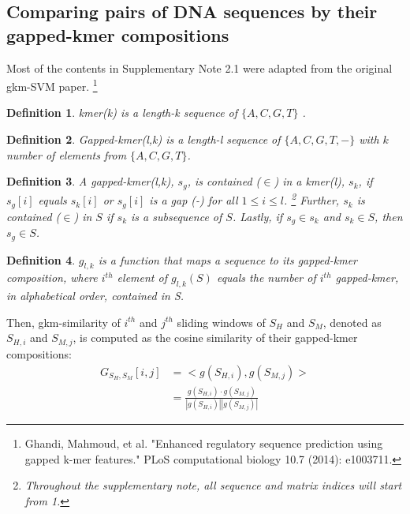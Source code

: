 \documentclass[english]{article}
\newtheorem{definition}{Definition}
\begin{document}
\subsection{Comparing pairs of DNA sequences by their gapped-kmer compositions}
Most of the contents in Supplementary Note 2.1 were adapted from the original gkm-SVM paper. \footnote{Ghandi, Mahmoud, et al. "Enhanced regulatory sequence prediction using gapped k-mer features." PLoS computational biology 10.7 (2014): e1003711.}
\begin{definition}
  kmer(k) is a length-k sequence of $\{A,C,G,T\}$ .
\end{definition}
\begin{definition}
  Gapped-kmer(l,k) is a length-l sequence of $\{A,C,G,T,-\}$ with $k$ number of elements from $\{A,C,G,T\}$.
\end{definition}
\begin{definition}
  A gapped-kmer(l,k), $s_g$, is contained ($\in$) in a kmer(l), $s_k$, if $s_g[i]$ equals $s_k[i]$ or $s_g[i]$ is a gap (-) for all $1\leq i\leq l$. \footnote{Throughout the supplementary note, all sequence and matrix indices will start from 1.} Further,
  $s_k$ is contained ($\in$) in $S$ if $s_k$ is a subsequence of $S$. Lastly, if $s_g \in s_k$ and $s_k \in S$, then $s_g \in S$.

\end{definition}

\begin{definition}
   $g_{l,k}$ is a function that maps a sequence to its gapped-kmer composition, where $i^{th}$ element of $g_{l,k}(S)$ equals the number of $i^{th}$ gapped-kmer, in alphabetical order, contained in S. 
\end{definition}

Then, gkm-similarity of $i^{th}$ and $j^{th}$ sliding windows of $S_H$ and $S_M$, denoted as $S_{H,i}$ and $S_{M,j}$, is computed as the cosine similarity of their gapped-kmer compositions: 
\begin{align*}
G_{S_H,S_M} [i,j] &= <g(S_{H,i}), g(S_{M,j})>\\
&=\frac{g(S_{H,i}) \cdot g(S_{M,j})}{|g(S_{H,i})| |g(S_{M,j})|} \tag{Eq.1}
\end{align*}
\end{document}
